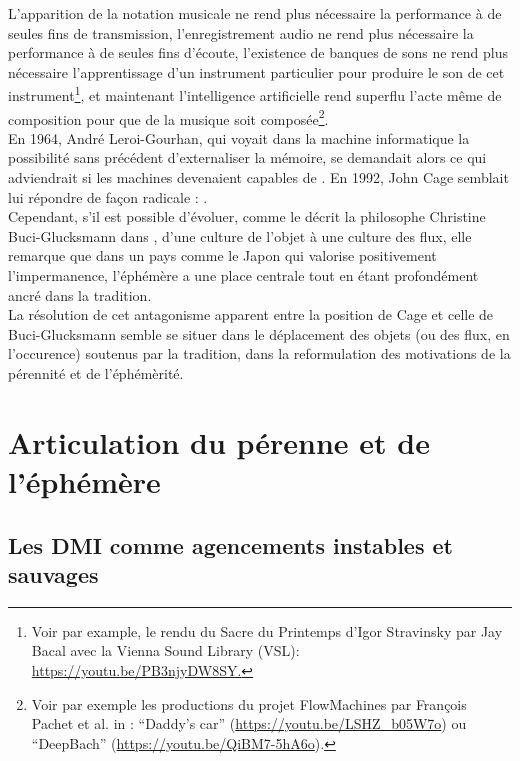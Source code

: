 \noindent L’apparition de la notation musicale ne rend plus nécessaire la performance à de seules fins de transmission, l’enregistrement audio ne rend plus nécessaire la performance à de seules fins d’écoute, l’existence de banques de sons ne rend plus nécessaire l’apprentissage d’un instrument particulier pour produire le son de cet instrument\footnote{Voir par example, le rendu du Sacre du Printemps d'Igor Stravinsky par Jay Bacal avec la Vienna Sound Library (VSL): \url{https://youtu.be/PB3njyDW8SY.}}, et maintenant l’intelligence artificielle rend superflu l'acte même de composition pour que de la musique soit composée\footnote{Voir par exemple les productions du projet FlowMachines par François Pachet et al. in \cite{hadjeres_deepbach:_2016}: “Daddy's car” (\url{https://youtu.be/LSHZ_b05W7o}) ou “DeepBach” (\url{https://youtu.be/QiBM7-5hA6o}).}.\\
\indent En 1964, André Leroi-Gourhan, qui voyait dans la machine informatique la possibilité sans précédent d'externaliser la mémoire, se demandait alors ce qui adviendrait si les machines devenaient capables de \cite{leroi-gourhan_geste_1964}. En 1992, John Cage semblait lui répondre de façon radicale :  \cite{sebestik_ecoute_1992}. \\
\indent Cependant, s'il est possible d'évoluer, comme le décrit la philosophe Christine Buci-Glucksmann dans \cite{buci-glucksmann_esthetique_2003}, d'une culture de l'objet à une culture des flux, elle remarque que dans un pays comme le Japon qui valorise positivement l'impermanence, l'éphémère a une place centrale tout en étant profondément ancré dans la tradition.\\
\indent La résolution de cet antagonisme apparent entre la position de Cage et celle de Buci-Glucksmann semble se situer dans le déplacement des objets (ou des flux, en l'occurence) soutenus par la tradition, dans la reformulation des motivations de la pérennité et de l'éphémèrité.

\section{Articulation du pérenne et de l'éphémère}

\subsection{Les DMI comme agencements instables et sauvages}

